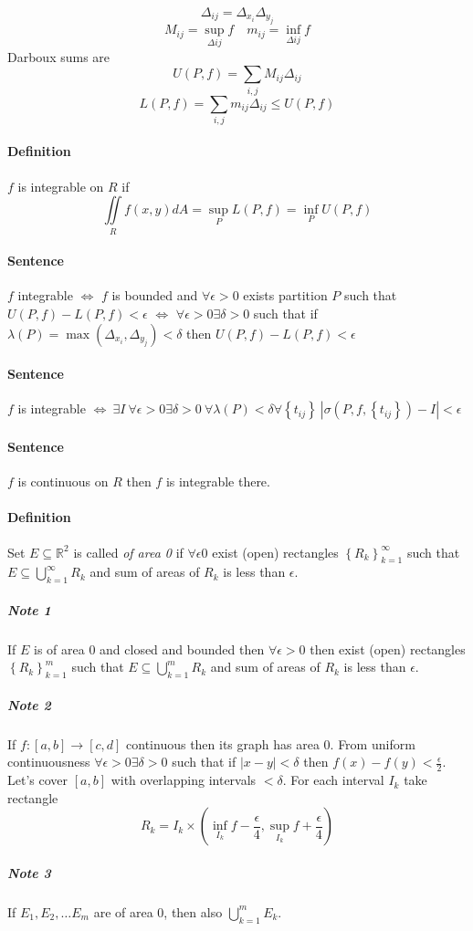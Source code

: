 $$\Delta_{ij} = \Delta_{x_i} \Delta_{y_j}$$
$$M_{ij} = \sup\limits_{\Delta ij} f \quad m_{ij} = \inf\limits_{\Delta ij} f$$
Darboux sums are
$$U(P,f) = \sum_{i,j} M_{ij} \Delta_{ij}$$
$$L(P,f) = \sum_{i,j} m_{ij} \Delta_{ij} \leq U(P,f)$$
\paragraph{Definition}
$f$ is integrable on $R$ if $$\iint\limits_{R} f(x,y) dA = \sup\limits_{P} L(P,f) = \inf\limits_{P} U(P,f)$$
\paragraph{Sentence}
$f$ integrable $\iff$ $f$ is bounded and $\forall \epsilon > 0$ exists partition $P$ such that $U(P,f) - L(P,f) < \epsilon$ $\iff$ $\forall \epsilon > 0 \exists \delta >0$ such that if $\lambda(P) = \max(\Delta_{x_i}, \Delta_{y_j}) < \delta$ then  $U(P,f) - L(P,f) < \epsilon$ 
\paragraph{Sentence}
$f$ is integrable $\iff \:\exists I \:  \forall \epsilon > 0 \exists \delta > 0 \: \forall \lambda(P) < \delta \forall \left\{ t_{ij} \right\} \: \left|\sigma(P,f, \left\{ t_{ij} \right\} ) - I\right| < \epsilon$
\paragraph{Sentence} $f$ is continuous on $R$ then $f$ is integrable there.
\paragraph{Definition} Set $E\subseteq \mathbb{R}^2$ is called \textit{of area 0} if $\forall \epsilon 0$ exist (open) rectangles $\left\{ R_k \right\}_{k=1}^\infty$ such that $E \subseteq \bigcup_{k=1}^\infty R_k$ and sum of areas of $R_k$ is less than $\epsilon$.
\subparagraph{Note 1} If $E$ is of area 0 and closed and bounded then $\forall \epsilon > 0$ then exist (open) rectangles $\left\{ R_k \right\}_{k=1}^m$ such that $E \subseteq \bigcup_{k=1}^m R_k$ and sum of areas of $R_k$ is less than $\epsilon$.
\subparagraph{Note 2} If $f: [a,b]\to[c,d]$ continuous then its graph has area 0. From uniform continuousness $\forall \epsilon > 0 \exists \delta > 0 $ such that if $|x-y|<\delta$ then $f(x)-f(y) < \frac{\epsilon}{2}$. Let's cover $[a,b]$ with overlapping intervals $<\delta$. For each interval $I_k$ take rectangle
$$R_k = I_k \times \left(\inf\limits_{I_k} f-\frac{\epsilon}{4}, \sup\limits_{I_k} f+\frac{\epsilon}{4} \right)$$
\subparagraph{Note 3} If $E_1, E_2,\dots E_m$ are of area 0, then also $\bigcup_{k=1}^{m} E_k$.
